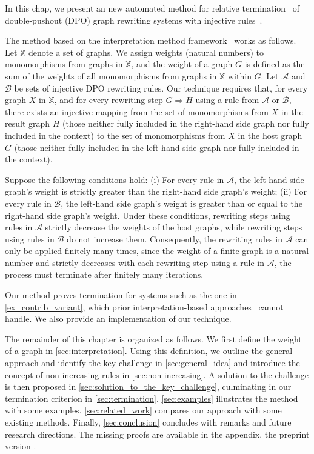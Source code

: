 
In this chap, we present an new automated method for relative termination~\cite{geser1990relative} of double-pushout (DPO) graph rewriting systems with injective rules~\cite{corradini1997algebraic,habel2001double,konig2018atutorial}. 

The method based on the interpretation method framework~\cite{nipkow1998term} works as follows. Let \( \mathbb{X} \) denote a set of graphs. We assign weights (natural numbers) to monomorphisms from graphs in \( \mathbb{X} \), and the weight of a graph $G$ is defined as the sum of the weights of all monomorphisms from graphs in \( \mathbb{X} \) within $G$. Let $\mathcal{A}$ and $\mathcal{B}$ be sets of injective DPO rewriting rules. Our technique requires that, for every graph $X$ in $\mathbb{X}$, and for every rewriting step $G \Rightarrow H$ using a rule from $\mathcal{A}$ or $\mathcal{B}$, there exists an injective mapping from the set of monomorphisms from $X$ in the result graph $H$
(those neither fully included in the right-hand side graph nor fully included in the context)
 to the set of monomorphisms from $X$ in the host graph $G$ (those neither fully included in the left-hand side graph nor fully included in the context).   

Suppose the following conditions hold: (i) For every rule in \( \mathcal{A} \), the left-hand side graph's weight is strictly greater than the right-hand side graph's weight; (ii) For every rule in \( \mathcal{B} \), the left-hand side graph's weight is greater than or equal to the right-hand side graph's weight. 
Under these conditions, rewriting steps using rules in \( \mathcal{A} \) strictly decrease the weights of the host graphs, while rewriting steps using rules in \( \mathcal{B} \) do not increase them.
Consequently, the rewriting rules in \( \mathcal{A} \) can only be applied finitely many times, since the weight of a finite graph is a natural number and strictly decreases with each rewriting step using a rule in \( \mathcal{A} \), the process must terminate after finitely many iterations.  
 
Our method proves termination for systems such as the one in \autoref{ex_contrib_variant}, which prior interpretation-based approaches~\cite{zantema2014termination,bruggink2014termination,bruggink2015proving,
endrullis2024generalized_arxiv_v2,
overbeek2024termination_lmcs} cannot handle. 
We also provide an implementation of our technique.  
   
The remainder of this chapter is organized as follows.
We first define the weight of a graph in \autoref{sec:interpretation}. 
Using this definition, we outline the general approach and identify the key challenge in \autoref{sec:general_idea} and introduce the concept of non-increasing rules in \autoref{sec:non-increasing}. 
A solution to the challenge is then proposed in \autoref{sec:solution_to_the_key_challenge}, culminating in our termination criterion in \autoref{sec:termination}.
\autoref{sec:examples} illustrates the method with some examples.
\autoref{sec:related_work} compares our approach with some existing methods.
Finally, \autoref{sec:conclusion} concludes with remarks and future research directions. The missing proofs are available in 
\iflongversion
the appendix.
\else
the preprint version \cite{qiu2025termination}.
\fi